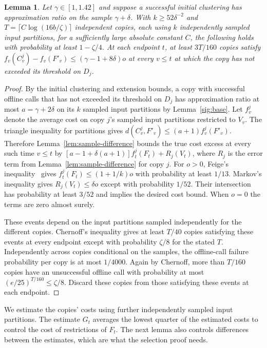 \documentclass[11pt]{article}
\newtheorem{lemma}[theorem]{Lemma}
\begin{document}
\begin{lemma}\label{lem:online-training}
Let $\gamma\in[1,1.42]$ and suppose a successful initial clustering has approximation
ratio on the sample $\gamma+\delta$. With $k\ge52\delta^{-2}$ and
$T=\lceil C\log(16b/\zeta)\rceil$ independent copies, each using $k$
independently sampled input partitions, for a sufficiently large
absolute constant $C$, the following holds with
probability at least $1-\zeta/4$. At each endpoint $t$, at least
$3T/160$ copies satisfy
$f_v(C^j_v)-f_v(F'_v)\le(\gamma-1+8\delta)o$ at every $v\le t$ at which the copy has not exceeded its threshold on $D_j$.
\end{lemma}
\begin{proof}
By the initial clustering and extension bounds, a copy with successful offline calls
that has not exceeded its threshold on $D_j$ has
approximation ratio at most $a=\gamma+2\delta$ on its $k$ sampled input partitions by
Lemma~\ref{sig:base}. Let $f^j_v$ denote the average cost on copy $j$'s sampled input
partitions restricted to $V_v$.
The triangle inequality for partitions gives
$d(C^j_v,F'_v)\le(a+1)f^j_v(F'_v)$. Therefore
Lemma~\ref{lem:sample-difference} bounds the true cost excess at
every such time $v\le t$ by
$[a-1+\delta(a+1)]f^j_t(F_t)+R_j(V_t)$, where $R_j$ is the
error term from Lemma~\ref{lem:sample-difference} for copy $j$. For $o>0$, Feige's inequality~\cite{Feige}
gives $f^j_t(F_t)\le(1+1/k)o$ with probability at least $1/13$.
Markov's inequality gives $R_j(V_t)\le\delta o$ except with
probability $1/52$. Their intersection has probability at least
$3/52$ and implies the desired cost bound. When $o=0$ the terms
are zero almost surely.

These events depend on the input partitions sampled independently for
the different copies. Chernoff's
inequality gives at least $T/40$ copies satisfying these events at every endpoint
except with probability $\zeta/8$ for the stated $T$. Independently
across copies conditional on the samples, the offline-call failure probability
per copy is at most $1/4000$. Again by Chernoff, more than $T/160$
copies have an unsuccessful offline call with probability at most
$(e/25)^{T/160}\le\zeta/8$. Discard these copies from those satisfying these events at each endpoint.
\end{proof}

We estimate the copies' costs using further independently sampled input
partitions. The estimate $G_t$
averages the lowest quarter of the estimated costs to control the cost of restrictions
of $F_t$. The next lemma also controls differences between the estimates,
which are what the selection proof needs.
\end{document}
